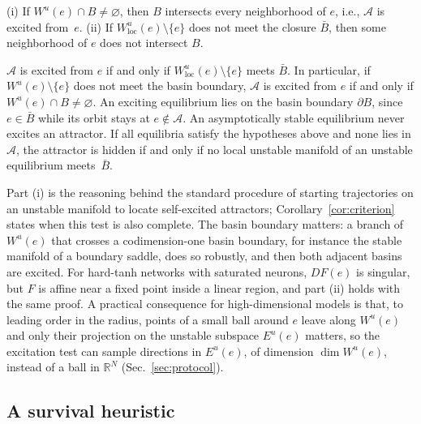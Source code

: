 \begin{proposition}
\label{prop:manifold}
(i) If $W^u(e)\cap B\neq\varnothing$, then $B$ intersects every neighborhood of $e$, i.e., $\mathcal{A}$ is excited
from~$e$. (ii) If $W^u_{\mathrm{loc}}(e)\setminus\{e\}$ does not meet the closure $\bar B$, then some neighborhood of $e$
does not intersect $B$.
\end{proposition}

\begin{corollary}
\label{cor:criterion}
$\mathcal{A}$ is excited from $e$ if and only if $W^u_{\mathrm{loc}}(e)\setminus\{e\}$ meets $\bar B$. In particular, if
$W^u(e)\setminus\{e\}$ does not meet the basin boundary, $\mathcal{A}$ is excited from $e$ if and only if
$W^u(e)\cap B\neq\varnothing$. An exciting equilibrium lies on the basin boundary $\partial B$, since $e\in\bar B$ while its
orbit stays at $e\notin\mathcal{A}$. An asymptotically stable equilibrium never excites an attractor. If all equilibria satisfy the hypotheses above and none lies
in $\mathcal{A}$, the attractor is hidden if and only if no local unstable manifold of an unstable equilibrium
meets~$\bar B$.
\end{corollary}

Part (i) is the reasoning behind the standard procedure of starting trajectories on an unstable manifold to locate
self-excited attractors;\cite{LeonovKuznetsov2013,Dudkowski2016} Corollary~\ref{cor:criterion} states when this test is also
complete. The basin boundary matters: a branch of $W^u(e)$ that crosses a codimension-one basin boundary, for instance the
stable manifold of a boundary saddle, does so robustly, and then both adjacent basins are excited. For hard-tanh networks
with saturated neurons, $DF(e)$ is singular, but $F$ is affine near a fixed point inside a linear region, and
part (ii) holds with the same proof. A practical consequence for high-dimensional models is that, to leading order in the
radius, points of a small ball around $e$ leave along $W^u(e)$ and only their projection on the unstable subspace
$E^u(e)$ matters, so the excitation test can sample directions in $E^u(e)$, of dimension $\dim W^u(e)$, instead of a ball
in $\mathbb{R}^N$ (Sec.~\ref{sec:protocol}).

\subsection{A survival heuristic}
\label{sec:heuristic}


